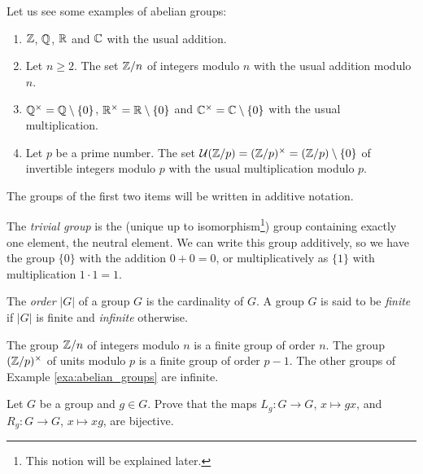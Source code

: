 \begin{example}
\label{exa:abelian_groups}
    Let us see some examples of 
    abelian groups: 
    \begin{enumerate}
        \item $\mathbb{Z}$, $\mathbb{Q}$, $\mathbb{R}$ and $\mathbb{C}$ with the usual addition. 
        \item Let $n\geq2$. The set $\mathbb{Z}/n$ of integers modulo $n$ with the usual addition modulo $n$.
        \item $\mathbb{Q}^\times=\mathbb{Q}\setminus\{0\}$, $\mathbb{R}^\times=\mathbb{R}\setminus\{0\}$ and $\mathbb{C}^\times=\mathbb{C}\setminus\{0\}$ 
        with the usual multiplication.
      \item Let $p$ be a prime number. The set
        $\mathcal{U}(\mathbb{Z}/p)=(\mathbb{Z}/p)^{\times}=(\mathbb{Z}/p)\setminus\{0\}$ of invertible
        integers modulo $p$ with the usual multiplication modulo $p$. 
    \end{enumerate}
\end{example}

The groups of the first two items will be written in additive notation. 

The \emph{trivial group} is the (unique up to isomorphism\footnote{This notion
will be explained later.}) group containing exactly one element, the neutral
element. We can write this group additively, so we have the group $\{0\}$ with
the addition $0+0=0$, or multiplicatively as $\{1\}$ with multiplication
$1\cdot 1=1$. 

\begin{definition}
  The \emph{order} $|G|$ of a group $G$ is the 
  cardinality of $G$. A group $G$ is said to be
  \emph{finite} if $|G|$ is finite and \emph{infinite}
  otherwise. 
\end{definition}

The group $\mathbb{Z}/n$ of integers modulo $n$ is a finite group of order $n$. 
The group $(\mathbb{Z}/p)^{\times}$ of units modulo $p$ is a finite
group of order $p-1$. The other groups of Example \ref{exa:abelian_groups} are infinite. 

\begin{exercise}
\label{xca:LR}
Let $G$ be a group and $g\in G$. Prove that 
the maps $L_g\colon G\to G$, $x\mapsto gx$, and 
$R_g\colon G\to G$, $x\mapsto xg$, are bijective. 
\end{exercise}

